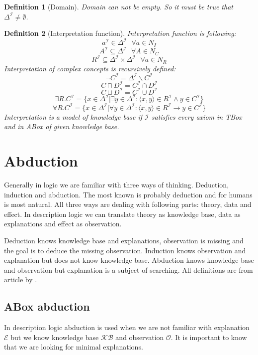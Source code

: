 \documentclass[12pt,a4paper]{article}
\newtheorem{definition}{Definition}[subsection]
\begin{document}
\begin{definition}[Domain]
	Domain can not be empty. So it must be true that $\Delta^{\mathcal{I}} \not = \emptyset$.
\end{definition}

\begin{definition}[Interpretation function]
	Interpretation function is following:
	\[ a^{\mathcal{I}} \in \Delta^{\mathcal{I}} \text{ } \forall a \in N_{I} \]
	\[ A^{\mathcal{I}} \subseteq \Delta^{\mathcal{I}} \text{ } \forall A \in N_{C} \]
	\[ R^{\mathcal{I}} \subseteq \Delta^{\mathcal{I}} \times \Delta^{\mathcal{I}} \text{ } \forall a \in N_{R} \]
	Interpretation of complex concepts is recursively defined:
	\[ \neg C^{\mathcal{I}} = \Delta^{\mathcal{I}} \backslash C^{\mathcal{I}} \]
	\[ C \sqcap D^{\mathcal{I}} = C^{\mathcal{I}} \cap D^{\mathcal{I}} \]
	\[ C \sqcup D^{\mathcal{I}} = C^{\mathcal{I}} \cup D^{\mathcal{I}} \]
	\[ \exists R.C^{\mathcal{I}} = \{ x \in \Delta^{\mathcal{I}} | \exists y \in \Delta^{\mathcal{I}} : \langle x,y \rangle \in R^{\mathcal{I}} \land y \in C^{\mathcal{I}} \} \]
	\[ \forall R.C^{\mathcal{I}} = \{ x \in \Delta^{\mathcal{I}} | \forall y \in \Delta^{\mathcal{I}} : \langle x,y \rangle \in R^{\mathcal{I}} \rightarrow y \in C^{\mathcal{I}} \} \]
	Interpretation is a model of knowledge base if $\mathcal{I}$ satisfies every axiom in \textit{TBox} and in \textit{ABox} of given knowledge base.
\end{definition}

\section{Abduction}
Generally in logic we are familiar with three ways of thinking. Deduction, induction and abduction. The most known is probably deduction and for humans is most natural. All three ways are dealing with following parts: theory, data and effect. In description logic we can translate theory as knowledge base, data as explanations and  effect as observation.

Deduction knows knowledge base and explanations, observation is missing and the goal is to deduce the missing observation. Induction knows observation and explanation but does not know knowledge base. Abduction knows knowledge base and observation but explanation is a subject of searching. All definitions are from article by \citep{pukancovaAboxAbduction}.

\subsection{ABox abduction}
In description logic abduction is used when we are not familiar with explanation $\mathcal{E}$ but we know knowledge base $\mathcal{KB}$ and observation $\mathcal{O}$. It is important to know that we are looking for minimal explanations.
\end{document}
